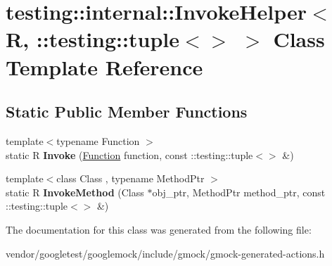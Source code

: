 \hypertarget{classtesting_1_1internal_1_1_invoke_helper_3_01_r_00_01_1_1testing_1_1tuple_3_4_01_4}{}\section{testing\+:\+:internal\+:\+:Invoke\+Helper$<$ R, \+:\+:testing\+:\+:tuple$<$$>$ $>$ Class Template Reference}
\label{classtesting_1_1internal_1_1_invoke_helper_3_01_r_00_01_1_1testing_1_1tuple_3_4_01_4}
\subsection*{Static Public Member Functions}
\begin{DoxyCompactItemize}
\item 
\mbox{\label{classtesting_1_1internal_1_1_invoke_helper_3_01_r_00_01_1_1testing_1_1tuple_3_4_01_4_a55e6218235e69a896d88a3076a2c6150}} 
{\footnotesize template$<$typename Function $>$ }\\static R {\bfseries Invoke} (\mbox{\hyperlink{structtesting_1_1internal_1_1_function}{Function}} function, const \+::testing\+::tuple$<$$>$ \&)
\item 
\mbox{\label{classtesting_1_1internal_1_1_invoke_helper_3_01_r_00_01_1_1testing_1_1tuple_3_4_01_4_a0368e26cbc1bcb12abbfb802f8294fa0}} 
{\footnotesize template$<$class Class , typename Method\+Ptr $>$ }\\static R {\bfseries Invoke\+Method} (Class $\ast$obj\+\_\+ptr, Method\+Ptr method\+\_\+ptr, const \+::testing\+::tuple$<$$>$ \&)
\end{DoxyCompactItemize}


The documentation for this class was generated from the following file\+:\begin{DoxyCompactItemize}
\item 
vendor/googletest/googlemock/include/gmock/gmock-\/generated-\/actions.\+h\end{DoxyCompactItemize}
